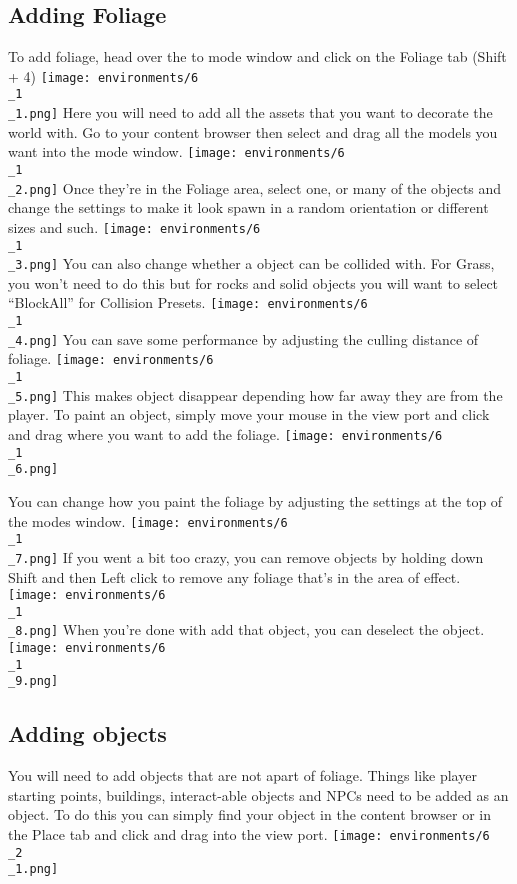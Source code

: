 \documentclass[../main.tex]{subfiles}
\begin{document}
\subsection{Adding Foliage}
To add foliage, head over the to mode window and click on the Foliage tab (Shift + 4)
\texttt{[image: environments/6\\\_1\\\_1.png]}
Here you will need to add all the assets that you want to decorate the world with.
Go to your content browser then select and drag all the models you want into the mode window.
\texttt{[image: environments/6\\\_1\\\_2.png]}
Once they’re in the Foliage area, select one, or many of the objects and change the settings to make it look spawn in a random orientation or different sizes and such.
\texttt{[image: environments/6\\\_1\\\_3.png]}
You can also change whether a object can be collided with. For Grass, you won’t need to do this but for rocks and solid objects you will want to select “BlockAll” for Collision Presets.
\texttt{[image: environments/6\\\_1\\\_4.png]}
You can save some performance by adjusting the culling distance of foliage.
\texttt{[image: environments/6\\\_1\\\_5.png]}
This makes object disappear depending how far away they are from the player.
To paint an object, simply move your mouse in the view port and click and drag where you want to add the foliage.
\texttt{[image: environments/6\\\_1\\\_6.png]}

You can change how you paint the foliage by adjusting the settings at the top of the modes window.
\texttt{[image: environments/6\\\_1\\\_7.png]}
If you went a bit too crazy, you can remove objects by holding down Shift and then Left click to remove any foliage that’s in the area of effect.
\texttt{[image: environments/6\\\_1\\\_8.png]}
When you’re done with add that object, you can deselect the object.
\texttt{[image: environments/6\\\_1\\\_9.png]}

\subsection{Adding objects}
You will need to add objects that are not apart of foliage. Things like player starting points, buildings, interact-able objects and NPCs need to be added as an object.
To do this you can simply find your object in the content browser or in the Place tab and click and drag into the view port.
\texttt{[image: environments/6\\\_2\\\_1.png]}
\end{document}

